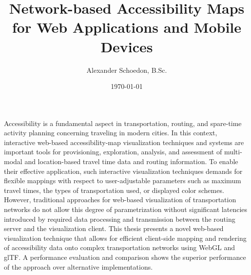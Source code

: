 \documentclass[english]{cgsthesis}
\title{
  \huge Network-based Accessibility Maps\\
  for Web Applications and Mobile Devices
}
\author{Alexander Schoedon, B.Sc.}
\date{\today}
\begin{document}
\frontmatter
\maketitle

\cleardoublepage
{}
Accessibility is a fundamental aspect in transportation, routing, and spare-time
activity planning concerning traveling in modern cities. In this context,
interactive web-based accessibility-map visualization techniques and systems
are important tools for provisioning, exploration, analysis, and assessment of
multi-modal and location-based travel time data and routing information. To
enable their effective application, such interactive visualization techniques
demands for flexible mappings with respect to user-adjustable parameters such
as maximum travel times, the types of transportation used, or displayed color
schemes. However, traditional approaches for web-based visualization of
transportation networks do not allow this degree of parametrization without
significant latencies introduced by required data processing and transmission
between the routing server and the visualization client. This thesis presents
a novel web-based visualization technique that allows for efficient client-side
mapping and rendering of accessibility data onto complex transportation
networks using WebGL and glTF. A performance evaluation and comparison shows
the superior performance of the approach over alternative implementations.


\cleardoublepage
{}
{}
\tableofcontents

\cleardoublepage
\listoffigures

\cleardoublepage
\listoftables

\cleardoublepage
\lstlistoflistings

\cleardoublepage
\printglossary[type=acronym,title=List of Acronyms,toctitle=List of Acronyms]
\end{document}

